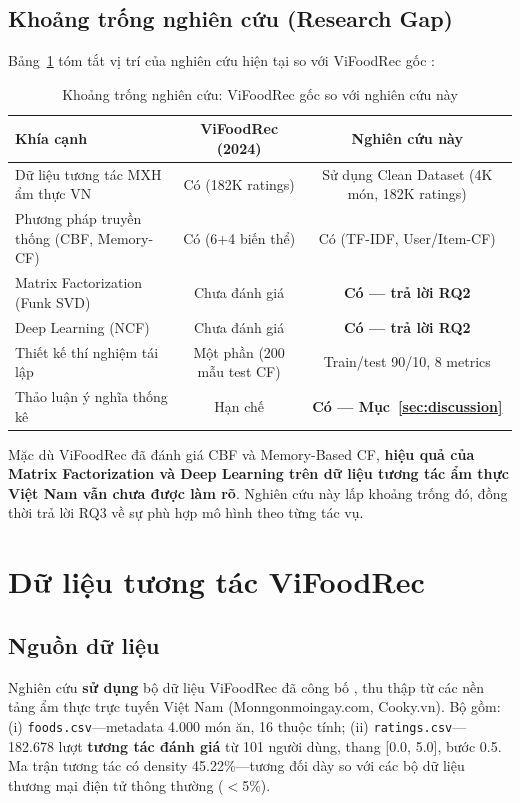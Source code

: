 \documentclass[11pt]{article}
\begin{document}
\subsection{Khoảng trống nghiên cứu (Research Gap)}
Bảng~\ref{tab:gap} tóm tắt vị trí của nghiên cứu hiện tại so với ViFoodRec gốc \cite{tran2024vifoodrec}:

\begin{table}[t]
\centering
\caption{Khoảng trống nghiên cứu: ViFoodRec gốc so với nghiên cứu này}
\label{tab:gap}
\begin{tabular}{lcc}
\toprule
\textbf{Khía cạnh} & \textbf{ViFoodRec (2024)} & \textbf{Nghiên cứu này} \\
\midrule
Dữ liệu tương tác MXH ẩm thực VN & Có (182K ratings) & Sử dụng Clean Dataset (4K món, 182K ratings) \\
Phương pháp truyền thống (CBF, Memory-CF) & Có (6+4 biến thể) & Có (TF-IDF, User/Item-CF) \\
Matrix Factorization (Funk SVD) & Chưa đánh giá & \textbf{Có --- trả lời RQ2} \\
Deep Learning (NCF) & Chưa đánh giá & \textbf{Có --- trả lời RQ2} \\
Thiết kế thí nghiệm tái lập & Một phần (200 mẫu test CF) & Train/test 90/10, 8 metrics \\
Thảo luận ý nghĩa thống kê & Hạn chế & \textbf{Có --- Mục~\ref{sec:discussion}} \\
\bottomrule
\end{tabular}
\end{table}

Mặc dù ViFoodRec đã đánh giá CBF và Memory-Based CF, \textbf{hiệu quả của Matrix Factorization và Deep Learning trên dữ liệu tương tác ẩm thực Việt Nam vẫn chưa được làm rõ}. Nghiên cứu này lấp khoảng trống đó, đồng thời trả lời RQ3 về sự phù hợp mô hình theo từng tác vụ.

\section{Dữ liệu tương tác ViFoodRec}
\label{sec:dataset}

\subsection{Nguồn dữ liệu}
Nghiên cứu \textbf{sử dụng} bộ dữ liệu ViFoodRec đã công bố \cite{tran2024vifoodrec}, thu thập từ các nền tảng ẩm thực trực tuyến Việt Nam (Monngonmoingay.com, Cooky.vn). Bộ gồm: (i) \texttt{foods.csv}---metadata 4.000 món ăn, 16 thuộc tính; (ii) \texttt{ratings.csv}---182.678 lượt \textbf{tương tác đánh giá} từ 101 người dùng, thang [0.0, 5.0], bước 0.5. Ma trận tương tác có density 45.22\%---tương đối dày so với các bộ dữ liệu thương mại điện tử thông thường ($<$5\%).
\end{document}

